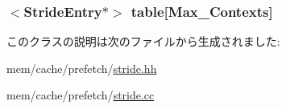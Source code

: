 \label{classStridePrefetcher_ac7ef7fbd9b695359dfcc4a03788a09d9}
\hypertarget{classStridePrefetcher_a55d29ec7c16821e665c5421be16cba2c}{
\subsubsection[{table}]{$<${\bf StrideEntry}$\ast$$>$ {\bf table}\mbox{[}{\bf Max\_\-Contexts}\mbox{]}}}
\label{classStridePrefetcher_a55d29ec7c16821e665c5421be16cba2c}


このクラスの説明は次のファイルから生成されました:\begin{DoxyCompactItemize}
\item 
mem/cache/prefetch/\hyperlink{stride_8hh}{stride.hh}\item 
mem/cache/prefetch/\hyperlink{stride_8cc}{stride.cc}\end{DoxyCompactItemize}
